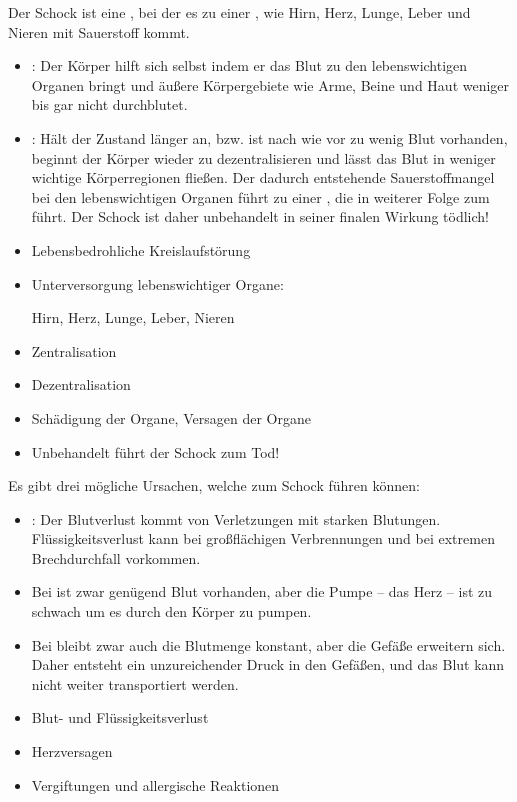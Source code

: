 {
Der Schock ist eine ,
bei der es zu einer , wie Hirn, Herz, Lunge, Leber und Nieren mit
Sauerstoff kommt.

\begin{itemize}
  \item {}: Der Körper hilft sich selbst
  indem er das Blut zu den lebenswichtigen Organen bringt
  und äußere Körpergebiete wie Arme, Beine und Haut weniger
  bis gar nicht durchblutet.
  \item {}: Hält der Zustand länger an,
  bzw. ist nach wie vor zu wenig Blut vorhanden, beginnt der
  Körper wieder zu dezentralisieren und lässt das Blut in
  weniger wichtige Körperregionen fließen. Der dadurch
  entstehende Sauerstoffmangel bei den lebenswichtigen
  Organen führt zu einer , die in
  weiterer Folge zum  führt. Der
  Schock ist daher unbehandelt in seiner finalen Wirkung
  tödlich!
\end{itemize}

}{
\begin{itemize}
  \item Lebensbedrohliche Kreislaufstörung
  \item Unterversorgung lebenswichtiger Organe:
  
  Hirn, Herz,
  Lunge, Leber, Nieren
  \item Zentralisation
  \item Dezentralisation
  \item Schädigung der Organe, Versagen der Organe
  \item Unbehandelt führt der Schock zum Tod!
\end{itemize}
}{}{}{}



{
Es gibt drei mögliche Ursachen, welche zum Schock führen
können:

\begin{itemize}
  \item {}: Der Blutverlust
  kommt von Verletzungen mit starken Blutungen.
  Flüssigkeitsverlust kann bei großflächigen Verbrennungen
  und
  bei extremen Brechdurchfall vorkommen.
  \item Bei  ist zwar
  genügend Blut vorhanden, aber die Pumpe -- das Herz -- ist
  zu schwach um es durch den Körper zu pumpen.
  \item Bei 
  bleibt zwar auch die Blutmenge konstant, aber die Gefäße
  erweitern sich. Daher entsteht ein unzureichender Druck in
  den Gefäßen, und das Blut kann nicht weiter transportiert
  werden.
\end{itemize}
}{
\begin{itemize}
  \item Blut- und Flüssigkeitsverlust
  \item Herzversagen
  \item Vergiftungen und allergische Reaktionen
\end{itemize}
}{}{}{}

